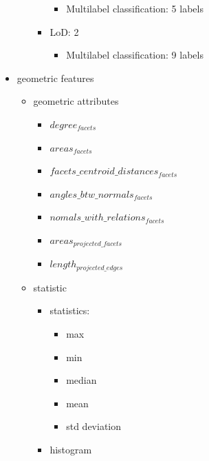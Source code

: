 \documentclass[../main.tex]{subfile}
\begin{document}
\begin{itemize}
\begin{itemize}
\begin{itemize}
                \begin{itemize}
                    \item Multilabel classification: 5 labels
                \end{itemize}
                \item LoD\@: 2
                \begin{itemize}
                    \item Multilabel classification: 9 labels
                \end{itemize}
            \end{itemize}
        \end{itemize}
    \end{itemize}

    \begin{itemize}
        \item geometric features
        \begin{itemize}
            \item geometric attributes
            \begin{itemize}
                \item $degree_{facets}$
                \item $areas_{facets}$
                \item $facets\_centroid\_distances_{facets}$
                \item $angles\_btw\_normals_{facets}$
                \item $nomals\_with\_relations_{facets}$
                \item $areas_{projected\_facets}$
                \item $length_{projected\_edges}$
            \end{itemize}
            \item statistic
            \begin{itemize}
                \item statistics:
                \begin{itemize}
                    \item max
                    \item min
                    \item median
                    \item mean
                    \item std deviation
                \end{itemize}
                \item histogram

\end{itemize}
\end{itemize}
\end{itemize}
\end{document}
